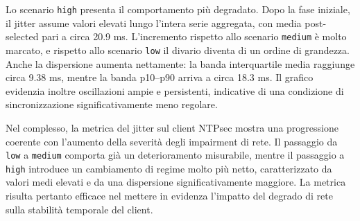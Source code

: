 Lo scenario \texttt{high} presenta il comportamento più degradato. Dopo la fase iniziale,
il jitter assume valori elevati lungo l’intera serie aggregata, con media post-selected
pari a circa 20.9 ms. L’incremento rispetto allo scenario \texttt{medium} è molto
marcato, e rispetto allo scenario \texttt{low} il divario diventa di un ordine di
grandezza. Anche la dispersione aumenta nettamente: la banda interquartile media raggiunge
circa 9.38 ms, mentre la banda p10--p90 arriva a circa 18.3 ms. Il grafico
evidenzia inoltre oscillazioni ampie e persistenti, indicative di una condizione di
sincronizzazione significativamente meno regolare.

Nel complesso, la metrica del jitter sul client NTPsec mostra una progressione
coerente con l’aumento della severità degli impairment di rete. Il passaggio da \texttt{low}
a \texttt{medium} comporta già un deterioramento misurabile, mentre il passaggio
a \texttt{high} introduce un cambiamento di regime molto più netto,
caratterizzato da valori medi elevati e da una dispersione significativamente
maggiore. La metrica risulta pertanto efficace nel mettere in evidenza l’impatto del
degrado di rete sulla stabilità temporale del client.

